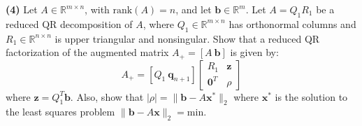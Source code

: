 \documentclass[a4paper,11pt]{article}
\newcommand{\R}{\mathbb{R}}
\begin{document}
\noindent \textbf{(4)} Let $A \in \R^{m\times n}$, with $\text{rank}(A) = n$, and let $\textbf{b} \in \R^m$. Let $A = Q_1R_1$ be a reduced QR decomposition of $A$, where $Q_1 \in \R^{m\times n}$ has orthonormal columns and $R_1 \in \R^{n\times n}$ is upper triangular and nonsingular. Show that a reduced QR factorization of the augmented matrix $A_+ = [ A\ \textbf{b} ]$ is given by:
\begin{equation}\label{key}
	A_+=[Q_1\  \textbf{q}_{n+1}] \begin{bmatrix}
		R_1& \textbf{z}  \\
		\textbf{0}^T& \rho 
	\end{bmatrix}
\end{equation}
where $\textbf{z} = Q_1^T\textbf{b}$. Also, show that $|\rho| = \lVert \textbf{b} - A \textbf{x}^*\rVert_2$ where $\textbf{x}^*$ is the solution to the least squares problem $\lVert \textbf{b} - A \textbf{x}\rVert_2= \text{min} $.\\
\end{document}
